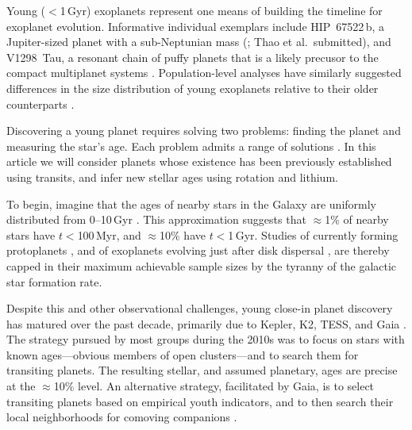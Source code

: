 \documentclass[11pt,twocolumn,tighten]{aastex63}
\begin{document}
Young ($<$1\,Gyr) exoplanets represent one means of building the
timeline for exoplanet evolution.  Informative individual exemplars
include HIP~67522\,b, a Jupiter-sized planet with a sub-Neptunian mass
(\citealt{Rizzuto_2020}; Thao et al.~submitted), and V1298~Tau, a
resonant chain of puffy planets that is a likely precusor to the
compact multiplanet systems \citep{David_2019}.  Population-level
analyses have similarly suggested differences in the size distribution
of young exoplanets relative to their older counterparts
\citep{Berger_2020b_rpage,David_2021,Sandoval_2021,2023AJ....166..248C,Vach2024}.

Discovering a young planet requires solving two problems: finding the
planet and measuring the star's age.  Each problem admits a range of
solutions
\citep[e.g.][]{2008Sci...322.1348M,2012ApJ...756L..33Q,2024AJ....167..193T}.
In this article we will consider planets whose existence has been
previously established using transits, and infer new stellar ages
using rotation and lithium.

To begin, imagine that the ages of nearby stars in the Galaxy are
uniformly distributed from 0--10\,Gyr
\citep[][]{2000MNRAS.318..658B,Nordstrom_2004}.  This approximation
suggests that $\approx$1\% of nearby stars have $t$$<$100\,Myr, and
$\approx$10\% have $t$$<$1\,Gyr.  Studies of currently forming
protoplanets \citep{2018A&A...617A..44K}, and of exoplanets evolving
just after disk dispersal \citep[e.g.][]{2022MNRAS.512.5067K}, are
thereby capped in their maximum achievable sample sizes by the tyranny
of the galactic star formation rate.

Despite this and other observational challenges, young close-in planet
discovery has matured over the past decade, primarily due to Kepler,
K2, TESS, and Gaia
\citep[e.g.][]{Meibom_2013,Mann_K2_25_2016,Curtis_2018,Livingston_2018,Bouma_2020_toi837,Plavchan_2020,Newton_2021,Nardiello_2022,Barber_2022,Zhou_2022,Zakhozhay_2022,Wood_2023}.
The strategy pursued by most groups during the 2010s was to focus on
stars with known ages---obvious members of open clusters---and to
search them for transiting planets.  The resulting stellar, and
assumed planetary, ages are precise at the $\approx$10\% level.  
An alternative strategy, facilitated by Gaia, is to select transiting
planets based on empirical youth indicators, and to then search their local
neighborhoods for comoving companions \citep[e.g.][]{Tofflemire_2021}.
\end{document}
